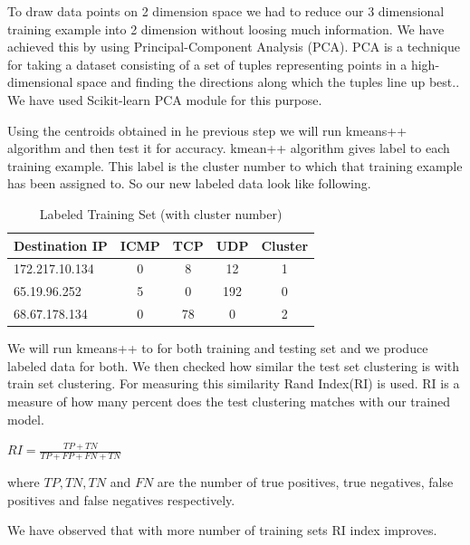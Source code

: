 \documentclass[10pt,oneside,a4paper]{article}
\begin{document}
To draw data points on 2 dimension space we had to reduce our 3 dimensional training example into 2 dimension without loosing much information. We have achieved this by using Principal-Component Analysis (PCA). PCA is a technique for taking a dataset consisting of a set of tuples representing points in a high-dimensional space and finding the directions along which the tuples line up best.\cite{pca}. We have used Scikit-learn PCA module for this purpose.

Using the centroids obtained in he previous step we will run kmeans++ algorithm and then test it for accuracy. kmean++ algorithm gives label to each training example. This label is the cluster number to which that training example has been assigned to. So our new labeled data look like following.

\begin{table}[H]
\centering
  \begin{tabular}{| l | c | c | c | c |}
    \hline
    {Destination IP}  &ICMP  &TCP &UDP  &Cluster \\
    \hline
    172.217.10.134  & 0     & 8     & 12  &1  \\ \hline
    65.19.96.252    & 5     & 0     & 192 &0  \\ \hline
    68.67.178.134   & 0     & 78    & 0   &2  \\ \hline
  \end{tabular}
\caption{Labeled Training Set (with cluster number)} \label{table:labeled-set}
\end{table}


We will run kmeans++ to for both training and testing set and we produce labeled data for both. We then checked how similar the test set clustering is with train set clustering. For measuring this similarity Rand Index(RI)\cite{ri-index} is used. RI is a measure of how many percent does the test clustering matches with our trained model.

\hspace{4cm} $RI={\frac {TP+TN}{TP+FP+FN+TN}}$

where $TP, TN, TN$ and $FN$ are the number of true positives, true negatives, false positives and false negatives respectively.

We have observed that with more number of training sets RI index improves.
\end{document}
